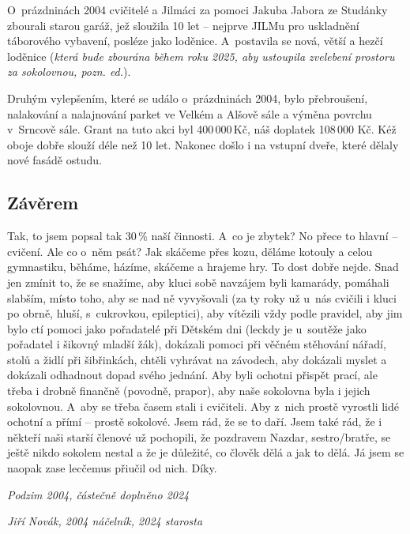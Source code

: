 \documentclass[a5paper, 11pt, twoside]{article}
\begin{document}
O~prázdninách 2004 cvičitelé a Jilmáci za pomoci Jakuba Jabora ze
Studánky zbourali starou garáž, jež sloužila 10 let -- nejprve JILMu pro
uskladnění táborového vybavení, posléze jako loděnice. A~postavila se
nová, větší a hezčí loděnice (\textit{která bude zbourána během roku 2025,
aby ustoupila zvelebení prostoru za sokolovnou, pozn. ed.}).

Druhým vylepšením, které se událo o~prázdninách 2004, bylo přebroušení,
nalakování a nalajnování parket ve Velkém a Alšově sále a výměna povrchu
v~Srncově sále. Grant na tuto akci byl 400\,000\,Kč, náš doplatek 108\,000
Kč. Kéž oboje dobře slouží déle než 10 let. Nakonec došlo i na vstupní
dveře, které dělaly nové fasádě ostudu.

\subsection{Závěrem}

Tak, to jsem popsal tak 30\,\% naší činnosti. A~co je zbytek? No přece to
hlavní -- cvičení. Ale co o~něm psát? Jak skáčeme přes kozu, děláme
kotouly a celou gymnastiku, běháme, házíme, skáčeme a hrajeme hry. To
dost dobře nejde. Snad jen zmínit to, že se snažíme, aby kluci sobě
navzájem byli kamarády, pomáhali slabším, místo toho, aby se nad ně
vyvyšovali (za ty roky už u~nás cvičili i kluci po obrně, hluší,
s~cukrovkou, epileptici), aby vítězili vždy podle pravidel, aby jim bylo
ctí pomoci jako pořadatelé při Dětském dni (leckdy je u~soutěže jako
pořadatel i šikovný mladší žák), dokázali pomoci při věčném stěhování
nářadí, stolů a židlí při šibřinkách, chtěli vyhrávat na závodech, aby
dokázali myslet a dokázali odhadnout dopad svého jednání. Aby byli
ochotni přispět prací, ale třeba i drobně finančně (povodně, prapor),
aby naše sokolovna byla i jejich sokolovnou. A~aby se třeba časem stali
i cvičiteli. Aby z~nich prostě vyrostli lidé ochotní a přímí -- prostě
sokolové. Jsem rád, že se to daří. Jsem také rád, že i někteří naši
starší členové už pochopili, že pozdravem Nazdar, sestro/bratře, se
ještě nikdo sokolem nestal a že je důležité, co člověk dělá a jak to
dělá. Já jsem se naopak zase lecčemus přiučil od nich. Díky.

\medskip
\hfill\textit{Podzim 2004, částečně doplněno 2024}

\hfill\textit{Jiří Novák, 2004 náčelník, 2024 starosta}
\end{document}
